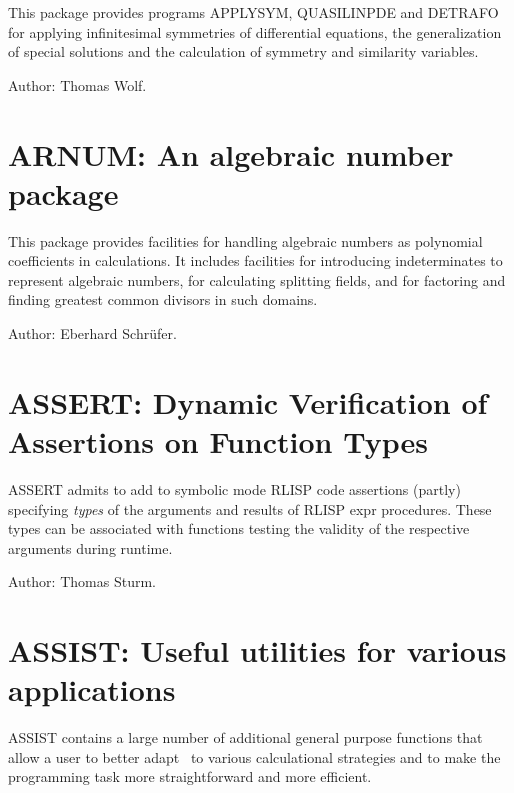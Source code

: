 This package provides programs APPLYSYM, QUASILINPDE and DETRAFO for
applying infinitesimal symmetries of differential equations, the
generalization of special solutions and the calculation of symmetry and
similarity variables.

Author: Thomas Wolf.



\newpage

\section{ARNUM: An algebraic number package}
\label{sec:package-arnum}


This package provides facilities for handling algebraic numbers as
polynomial coefficients in {\REDUCE} calculations. It includes facilities for
introducing indeterminates to represent algebraic numbers, for calculating
splitting fields, and for factoring and finding greatest common divisors
in such domains.

Author: Eberhard Schr\"ufer.



\newpage

\section{ASSERT: Dynamic Verification of Assertions on Function Types}
\label{ASSERT}

ASSERT admits to add to symbolic mode RLISP code assertions (partly)
specifying \emph{types} of the arguments and results of RLISP expr
procedures. These types can be associated with functions testing the
validity of the respective arguments during runtime.

Author: Thomas Sturm.



\newpage

\section{ASSIST: Useful utilities for various applications}
\label{ASSIST}\hypertarget{ASSIST}{}

ASSIST contains a large number of additional general purpose functions
that allow a user to better adapt \REDUCE\ to various calculational
strategies and to make the programming task more straightforward and more
efficient.

